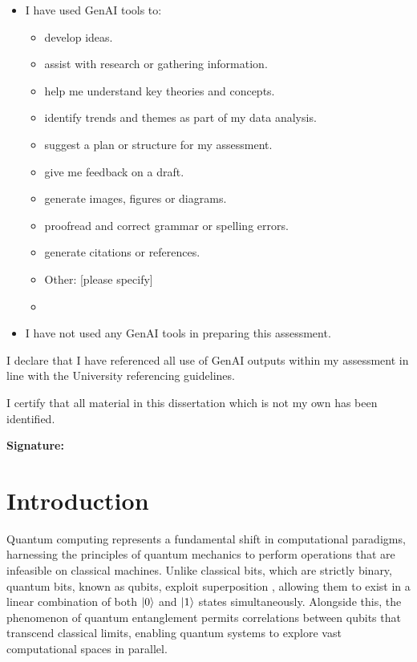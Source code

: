 \documentclass[11pt,a4paper]{article}
\begin{document}
\begin{itemize}[label={\ $\square$\ }, leftmargin=*]
 \item I have used GenAI tools to:
 \begin{itemize}[label={\ $\square$\ }, leftmargin=*]
  \item develop ideas.
  \item assist with research or gathering information.
  \item help me understand key theories and concepts.
  \item identify trends and themes as part of my data analysis.
  \item suggest a plan or structure for my assessment.
  \item give me feedback on a draft.
  \item generate images, figures or diagrams.
  \item proofread and correct grammar or spelling errors.
  \item generate citations or references.
  \item Other: [please specify]
  \item[]
 \end{itemize}
 \item I have not used any GenAI tools in preparing this assessment.
\end{itemize}

\bigskip
I declare that I have referenced all use of GenAI outputs within my assessment in line with the University referencing guidelines.

\vspace{1em}
I certify that all material in this dissertation which is not my own has been identified. 

\vspace{5em}
{\bf\noindent Signature:} \hrulefill
\newpage

\tableofcontents 
\thispagestyle{empty} 
\newpage 

\clearpage
{} 

%
%
\section{Introduction}
Quantum computing represents a fundamental shift in computational paradigms, harnessing the principles of quantum mechanics to perform operations that are infeasible on classical machines. Unlike classical bits, which are strictly binary, quantum bits, known as qubits, exploit superposition \cite{Gudder1970ASP}, allowing them to exist in a linear combination of both $\ket{0}$ and $\ket{1}$ states simultaneously. Alongside this, the phenomenon of quantum entanglement \cite{horodecki2009quantum} permits correlations between qubits that transcend classical limits, enabling quantum systems to explore vast computational spaces in parallel.\newline
\end{document}
